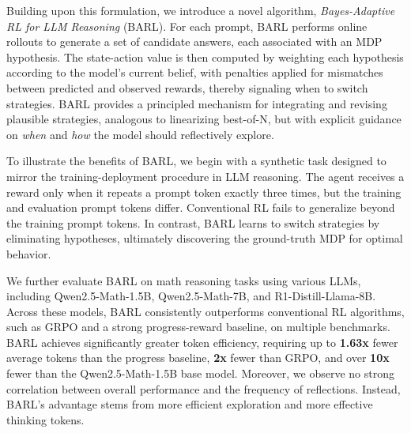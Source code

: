Building upon this formulation, we introduce a novel algorithm, \textit{Bayes-Adaptive RL for LLM Reasoning} (BARL). For each prompt, BARL performs online rollouts to generate a set of candidate answers, each associated with an MDP hypothesis. 
The state-action value is then computed by weighting each hypothesis according to the model’s current belief, with penalties applied for mismatches between predicted and observed rewards, thereby signaling when to switch strategies. BARL provides a principled mechanism for integrating and revising plausible strategies, analogous to linearizing best-of-N, but with explicit guidance on \textit{when} and \textit{how} the model should reflectively explore.

To illustrate the benefits of BARL, we begin with a synthetic task designed to mirror the training-deployment procedure in LLM reasoning. The agent receives a reward only when it repeats a prompt token exactly three times, but the training and evaluation prompt tokens differ. Conventional RL fails to generalize beyond the training prompt tokens. In contrast, BARL learns to switch strategies by eliminating hypotheses, ultimately discovering the ground-truth MDP for optimal behavior.

We further evaluate BARL on math reasoning tasks using various LLMs, including Qwen2.5-Math-1.5B, Qwen2.5-Math-7B, and R1-Distill-Llama-8B. Across these models, BARL consistently outperforms conventional RL algorithms, such as GRPO and a strong progress-reward baseline, on multiple benchmarks. BARL achieves significantly greater token efficiency, requiring up to \textbf{1.63x} fewer average tokens than the progress baseline, \textbf{2x} fewer than GRPO, and over \textbf{10x} fewer than the Qwen2.5-Math-1.5B base model. Moreover, we observe no strong correlation between overall performance and the frequency of reflections. Instead, BARL’s advantage stems from more efficient exploration and more effective thinking tokens.

